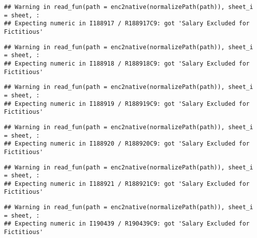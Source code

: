 \documentclass[
]{article}
\begin{document}
\begin{verbatim}
## Warning in read_fun(path = enc2native(normalizePath(path)), sheet_i = sheet, :
## Expecting numeric in I188917 / R188917C9: got 'Salary Excluded for Fictitious'
\end{verbatim}

\begin{verbatim}
## Warning in read_fun(path = enc2native(normalizePath(path)), sheet_i = sheet, :
## Expecting numeric in I188918 / R188918C9: got 'Salary Excluded for Fictitious'
\end{verbatim}

\begin{verbatim}
## Warning in read_fun(path = enc2native(normalizePath(path)), sheet_i = sheet, :
## Expecting numeric in I188919 / R188919C9: got 'Salary Excluded for Fictitious'
\end{verbatim}

\begin{verbatim}
## Warning in read_fun(path = enc2native(normalizePath(path)), sheet_i = sheet, :
## Expecting numeric in I188920 / R188920C9: got 'Salary Excluded for Fictitious'
\end{verbatim}

\begin{verbatim}
## Warning in read_fun(path = enc2native(normalizePath(path)), sheet_i = sheet, :
## Expecting numeric in I188921 / R188921C9: got 'Salary Excluded for Fictitious'
\end{verbatim}

\begin{verbatim}
## Warning in read_fun(path = enc2native(normalizePath(path)), sheet_i = sheet, :
## Expecting numeric in I190439 / R190439C9: got 'Salary Excluded for Fictitious'
\end{verbatim}
\end{document}

